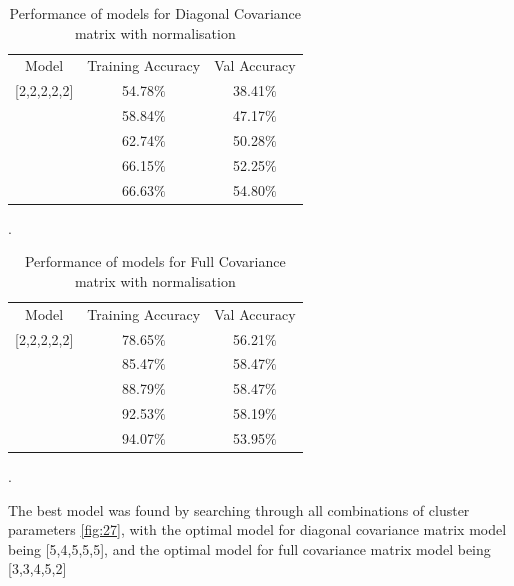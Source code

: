 {
\begin{table}[!h]
\centering
\begin{tabular}{ |c|c|c|  }
\hline
\rowcolor{lightgray} Model & Training Accuracy & Val Accuracy \\

[2,2,2,2,2] & 54.78$\%$  & 38.41$\%$ \\ 
\hline
[3,3,3,3,3] & 58.84$\%$  & 47.17$\%$ \\
\hline
[4,4,4,4,3] & 62.74$\%$  & 50.28$\%$ \\
\hline
[5,5,5,5,3] & 66.15$\%$  & 52.25$\%$ \\
\hline
[6,6,6,6,3] & 66.63$\%$  & 54.80$\%$ \\
\hline
\end{tabular}
\caption{Performance of models for Diagonal Covariance matrix with normalisation}.
\label{table:7}
\end{table}
}

{
\begin{table}[!h]
\centering
\begin{tabular}{ |c|c|c|  }
\hline
\rowcolor{lightgray} Model & Training Accuracy & Val Accuracy \\

[2,2,2,2,2] & 78.65$\%$  & 56.21$\%$ \\ 
\hline
[3,3,3,3,3] & 85.47$\%$  & 58.47$\%$ \\
\hline
[4,4,4,4,3] & 88.79$\%$  & 58.47$\%$ \\
\hline
[5,5,5,5,3] & 92.53$\%$  & 58.19$\%$ \\
\hline
[6,6,6,6,3] & 94.07$\%$  & 53.95$\%$ \\
\hline
\end{tabular}
\caption{Performance of models for Full Covariance matrix with normalisation}.
\label{table:7}
\end{table}
}

The best model was found by searching through all combinations of cluster parameters \ref{fig:27}, with the optimal model for diagonal covariance matrix model being [5,4,5,5,5], and the optimal model for full covariance matrix model being [3,3,4,5,2]


